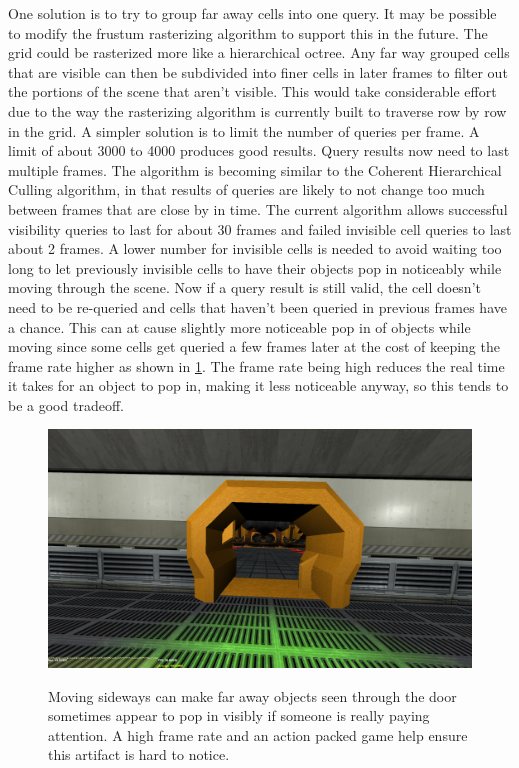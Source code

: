 \documentclass[12pt]{ucthesis}
\newcommand{\captionfonts}{\small\bf\ssp}
\begin{document}
One solution is to try to group far away cells into one query.
It may be possible to modify the frustum rasterizing algorithm to support this in the future.
The grid could be rasterized more like a hierarchical octree.
Any far way grouped cells that are visible can then be subdivided into finer cells in later frames to filter out the portions of the scene that aren't visible.
This would take considerable effort due to the way the rasterizing algorithm is currently built to traverse row by row in the grid.
A simpler solution is to limit the number of queries per frame.
A limit of about 3000 to 4000 produces good results.
Query results now need to last multiple frames.
The algorithm is becoming similar to the Coherent Hierarchical Culling algorithm, in that results of queries are likely to not change too much between frames that are close by in time. 
The current algorithm allows successful visibility queries to last for about 30 frames and failed invisible cell queries to last about 2 frames.
A lower number for invisible cells is needed to avoid waiting too long to let previously invisible cells to have their objects pop in noticeably while moving through the scene.
Now if a query result is still valid, the cell doesn't need to be re-queried and cells that haven't been queried in previous frames have a chance.
This can at cause slightly more noticeable pop in of objects while moving since some cells get queried a few frames later at the cost of keeping the frame rate higher as shown in \ref{fig:hall-doorway}.
The frame rate being high reduces the real time it takes for an object to pop in, making it less noticeable anyway, so this tends to be a good tradeoff.

\begin{figure}
\begin{center}
\includegraphics[width=\textwidth]{Images/HallDoorway.jpg}
\captionfonts
\caption[Hall Doorway]{Moving sideways can make far away objects seen through the door sometimes appear to pop in visibly if someone is really paying attention.
A high frame rate and an action packed game help ensure this artifact is hard to notice.}
\label{fig:hall-doorway}
\end{center}
\end{figure}
\end{document}
